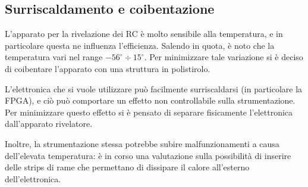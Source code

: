 \subsection*{Surriscaldamento e coibentazione}
L'apparato per la rivelazione dei RC è molto sensibile alla temperatura, e in particolare questa ne influenza l'efficienza. Salendo in quota, è noto che la temperatura vari nel range $-56^{\circ} \div 15^{\circ}$. Per minimizzare tale variazione si è deciso di coibentare l'apparato con una struttura in polistirolo.

L'elettronica che si vuole utilizzare può facilmente surriscaldarsi (in particolare la FPGA), e ciò può comportare un effetto non controllabile sulla strumentazione. Per minimizzare questo effetto si è pensato di separare fisicamente l'elettronica dall'apparato rivelatore.


Inoltre, la strumentazione stessa potrebbe subire malfunzionamenti a causa dell'elevata temperatura: è in corso una valutazione sulla possibilità di inserire delle strips di rame che permettano di dissipare il calore all'esterno dell'elettronica.
